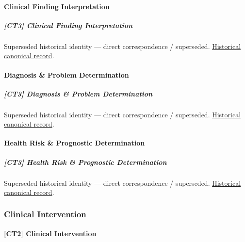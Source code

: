 \paragraph{Clinical Finding Interpretation}

\subparagraph{[CT3] Clinical Finding Interpretation}

\par\label{element:cf8ddfca7a8e4ed893ec39b795200d77}
Superseded historical identity — direct correspondence / superseded. \href{../../../../continuum/strategy/capability/cf8ddfca7a8e4ed893ec39b795200d77.md}{Historical canonical record}.\par

\paragraph{Diagnosis \& Problem Determination}

\subparagraph{[CT3] Diagnosis \& Problem Determination}

\par\label{element:e575c583783546ef85cf898523d18797}
Superseded historical identity — direct correspondence / superseded. \href{../../../../continuum/strategy/capability/e575c583783546ef85cf898523d18797.md}{Historical canonical record}.\par

\paragraph{Health Risk \& Prognostic Determination}

\subparagraph{[CT3] Health Risk \& Prognostic Determination}

\par\label{element:3215f0b0e1ce45e8ab16dae272ea6fe7}
Superseded historical identity — direct correspondence / superseded. \href{../../../../continuum/strategy/capability/3215f0b0e1ce45e8ab16dae272ea6fe7.md}{Historical canonical record}.\par

\subsubsection{Clinical Intervention}

\paragraph{[CT2] Clinical Intervention}

